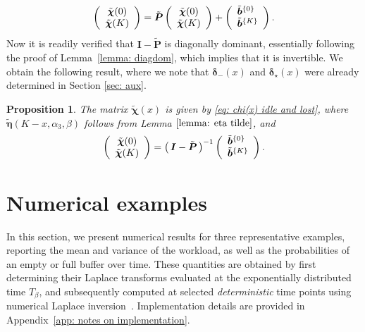 \documentclass[reqno,12pt]{amsart}
\newcommand{\bs}{\boldsymbol}
\newtheorem{proposition}{Proposition}
\begin{document}
{\begin{equation*}
    \left(\begin{array}{c} \tilde{\bs \chi}(0) \\ \tilde{\bs \chi}(K)\end{array} \right)= \tilde{\bs P}\left(\begin{array}{c} \tilde{\bs \chi}(0) \\ \tilde{\bs \chi}(K)\end{array} \right) + 
    \left(\begin{array}{l} {{\smash{\tilde{\bs b}}}^{\{0\}}} \\ {{\smash{\tilde{\bs b}}}^{\{K\}}}\end{array} \right).
\end{equation*}
Now it is readily verified that $\bs{I} - \tilde{\bs P}$ is diagonally dominant, essentially following the proof of Lemma~\ref{lemma: diagdom}, which implies that it is invertible. We obtain the following result, where we note that $\bs\delta_{-}(x)$ and $\bs\delta_{\star}(x)$ were already determined in Section \ref{sec: aux}.

\begin{proposition}\label{prop: decomp chi(0) CPP}
       The matrix $\tilde{\bs\chi}(x)$ is given by \eqref{eq: chi(x) idle and lost}, where $\tilde{\bs \eta}(K-x, \alpha_3, \beta)$ follows from Lemma $\ref{lemma: eta tilde}$, and 
\begin{align*}
    \left(\begin{array}{c} \tilde{\bs \chi}(0) \\ \tilde{\bs \chi}(K)\end{array} \right) = \left(\,\bs{I} - \tilde{\bs P}\,\right)^{-1} \left(\begin{array}{l} {{\smash{\tilde{\bs b}}}^{\{0\}}} \\ {{\smash{\tilde{\bs b}}}^{\{K\}}}\end{array} \right).
\end{align*}
\end{proposition}



\section{Numerical examples}\label{sec: num}
In this section, we present numerical results for three representative examples, reporting the mean and variance of the workload, as well as the probabilities of an empty or full buffer over time. These quantities are obtained by first determining their Laplace transforms evaluated at the exponentially distributed time $T_\beta$, and subsequently computed at selected {\it deterministic} time points using numerical Laplace inversion~\cite[\S 8]{AW2}. Implementation details are provided in Appendix~\ref{app: notes on implementation}.

}
\end{document}
